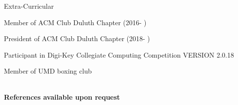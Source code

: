 \documentclass{resume} %
\begin{document}
\begin{rSection}{Extra-Curricular} \itemsep -3pt
\item Member of ACM Club Duluth Chapter (2016- )
\item President of ACM Club Duluth Chapter (2018- )
\item Participant in Digi-Key Collegiate Computing Competition VERSION 2.0.18
\item Member of UMD boxing club\\\\


\end{rSection} 

\centering\textbf{References available upon request}
\end{document}
